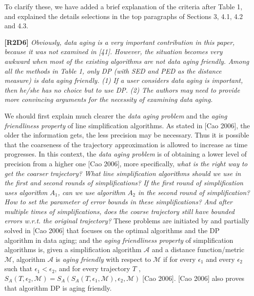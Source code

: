 \documentclass{letter}
\newcommand{\wrt}{\emph{w.r.t.}\xspace}
\begin{document}
{{To clarify these, we have added a brief explanation of the criteria after Table 1, and explained the details selections in the top paragraphs of Sections 3, 4.1, 4.2 and 4.3. 

\textbf{[R2D6]} \emph{Obviously, data aging is a very important contribution in this paper, because it was not examined in [41]. However, the situation becomes very awkward when most of the existing algorithms are not data aging friendly. Among all the methods in Table 1, only DP (with SED and PED as the distance measure) is data aging friendly. (1) {If a user considers data aging is important, then he/she has no choice but to use DP}. (2) {The authors may need to provide more convincing arguments for the necessity of examining data aging}.}

We should first explain much clearer the \emph{data aging problem} and the \emph{aging friendliness property} of line simplification algorithms. 
%
As stated in [Cao 2006], the older the information gets, the less precision may be necessary. Thus it is possible that the coarseness of the trajectory approximation is allowed to increase as time progresses. In this context, the \emph{data aging problem} is of obtaining a lower level of precision from a higher one [Cao 2006], more specifically, \emph{what is the right way to get the coarser trajectory? What line simplification algorithms should we use in the first and second rounds of simplifications? If the first round of simplification uses algorithm $A_1$, can we use algorithm $A_2$ in the second round of simplification? How to set the parameter of error bounds in these simplifications? And after multiple times of simplifications, does the coarse trajectory still have bounded errors \wrt the original trajectory?} These problems are initiated by and partially solved in [Cao 2006] that focuses on the optimal algorithms and the DP algorithm in data aging;
and the \emph{aging friendliness property} of simplification algorithms is,  given a simplification algorithm $\mathcal{A}$ and a distance function/metric $\mathcal{M}$, algorithm $\mathcal{A}$ is \emph{aging friendly} with respect to  $\mathcal{M}$ if for every $\epsilon_1$ and every $\epsilon_2$ such that $\epsilon_1 <\epsilon_2$, and
for every trajectory $T$ , $S_A(T, \epsilon_2,\mathcal{M}) = S_A(S_A(T, \epsilon_1,\mathcal{M}), \epsilon_2, \mathcal{M})$ [Cao 2006]. [Cao 2006] also proves that algorithm DP is aging friendly.

}}
\end{document}

